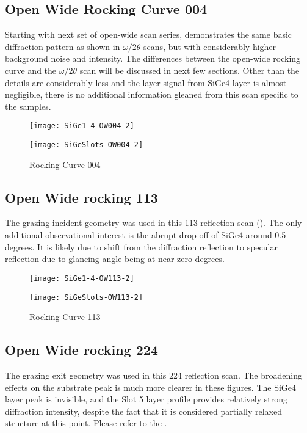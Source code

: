 \subsection{Open Wide Rocking Curve  004}
Starting with next set of open-wide scan series,  demonstrates the same basic diffraction pattern as shown in $\omega/2\theta$ scans, but with considerably higher background noise and intensity. The differences between the open-wide rocking curve and the $\omega/2\theta$ scan will be discussed in next few sections.  Other than the details are considerably less and the layer signal from SiGe4 layer is almost negligible, there is no additional information gleaned from this scan specific to the samples.
\begin{figure}%
\caption{Rocking Curve 004}
\label{OW004}
\begin{minipage}{0.85\linewidth}
\texttt{[image: SiGe1-4-OW004-2]}
\end{minipage}
\begin{minipage}{0.85\linewidth}
\texttt{[image: SiGeSlots-OW004-2]}
\end{minipage}
\end{figure}

\subsection{Open Wide rocking 113}
The grazing incident geometry was used in this 113 reflection scan ().  The only additional observational interest is the abrupt drop-off of SiGe4 around 0.5 degrees.  It is likely due to shift from the diffraction reflection to specular reflection due to glancing angle being at near zero degrees.

\begin{figure}%
\caption{Rocking Curve 113}
\label{OW113}
\begin{minipage}{0.85\linewidth}
\texttt{[image: SiGe1-4-OW113-2]}
\end{minipage}
\begin{minipage}{0.85\linewidth}
\texttt{[image: SiGeSlots-OW113-2]}
\end{minipage}
\end{figure}


\subsection{Open Wide rocking  224 }
The grazing exit geometry was used in this 224 reflection scan.  The broadening effects on the substrate peak is much more clearer in these figures.  The SiGe4 layer peak is invisible, and the Slot 5 layer profile provides relatively strong diffraction intensity, despite the fact that it is considered partially relaxed structure at this point.  Please refer to the .

